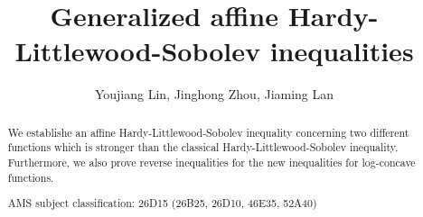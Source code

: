 \documentclass[preprint,12pt]{elsarticle}
\begin{document}
\begin{frontmatter}



\title{Generalized affine Hardy-Littlewood-Sobolev inequalities} %


\author{Youjiang Lin, Jinghong Zhou, Jiaming Lan} %


\begin{abstract}
We establishe an affine Hardy-Littlewood-Sobolev inequality concerning two different functions which
is stronger than the classical Hardy-Littlewood-Sobolev inequality. Furthermore, we also prove reverse inequalities for the new inequalities for log-concave functions.

\bigskip
{ AMS subject classification:  26D15 (26B25, 26D10, 46E35, 52A40)}
\end{abstract}


\end{frontmatter}
\end{document}
